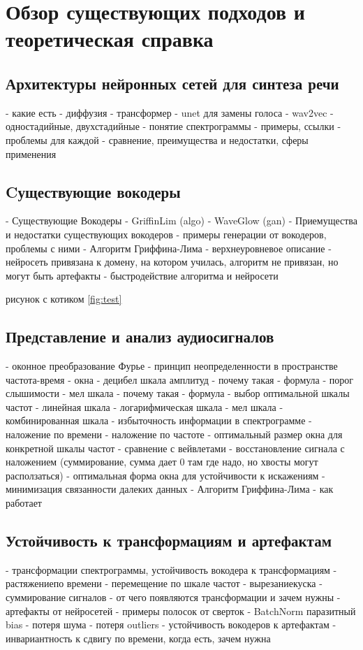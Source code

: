 \chapter{Обзор существующих подходов и теоретическая справка}
\label{cha:ch_1}


\section{Архитектуры нейронных сетей для синтеза речи}
 - какие есть
   - диффузия
   - трансформер
   - unet для замены голоса
   - wav2vec
   - одностадийные, двухстадийные
 - понятие спектрограммы
 - примеры, ссылки
 - проблемы для каждой
 - сравнение, преимущества и недостатки, сферы применения

\section{Cуществующие вокодеры}
 - Существующие Вокодеры
  - GriffinLim (algo) \cite{1164317}
  - WaveGlow (gan)
 - Приемущества и недостатки существующих вокодеров 
 - примеры генерации от вокодеров, проблемы с ними
 - Алгоритм Гриффина-Лима
  - верхнеуровневое описание
 - нейросеть привязана к домену, на котором училась, алгоритм не привязан, но могут быть артефакты
 - быстродействие алгоритма и нейросети

рисунок с котиком \ref{fig:test}

\section{Представление и анализ аудиосигналов}
 - оконное преобразование Фурье
 - принцип неопределенности в пространстве частота-время
 - окна
 - децибел шкала амплитуд
   - почему такая
   - формула
   - порог слышимости
 - мел шкала
   - почему такая
   - формула
 - выбор оптимальной шкалы частот
  - линейная шкала
  - логарифмическая шкала
  - мел шкала
  - комбинированная шкала
 - избыточность информации в спектрограмме
 - наложение по времени
 - наложение по частоте
 - оптимальный размер окна для конкретной шкалы частот
 - сравнение с вейвлетами
 - восстановление сигнала с наложением (суммирование, сумма дает 0 там где надо, но хвосты могут расползаться)
 - оптимальная форма окна для устойчивости к искажениям
   - минимизация связанности далеких данных
 - Алгоритм Гриффина-Лима
    - как работает

 \section{Устойчивость к трансформациям и артефактам}
 - трансформации спектрограммы, устойчивость вокодера к трансформациям
   - растяжение по времени
   - перемещение по шкале частот
   - вырезание куска
   - суммирование сигналов
 - от чего появляются трансформации и зачем нужны
 - артефакты от нейросетей
   - примеры полосок от сверток
   - BatchNorm паразитный bias
   - потеря шума
   - потеря outliers
 - устойчивость вокодеров к артефактам
 - инвариантность к сдвигу по времени, когда есть, зачем нужна

